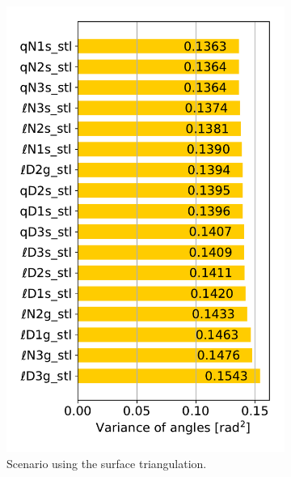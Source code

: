 \begin{figure}%
  \centering%
  \begin{subfigure}[t]{0.48\textwidth}%
    \centering%
    \includegraphics[width=\textwidth]{images/parallel_fiber_estimation/mesh_quality_options_0.pdf}%
    \caption{Scenario using the surface triangulation.}%
    \label{fig:mesh_quality_options_0}%
  \end{subfigure}
  \begin{subfigure}[t]{0.48\textwidth}%
    \centering%

\end{subfigure}
\end{figure}

